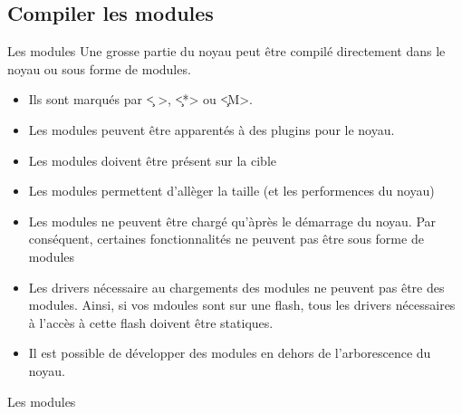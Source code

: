 \subsection{Compiler les modules}
\begin{frame}[fragile=singleslide]{Les modules}
  Une grosse  partie du  noyau peut être  compilé directement  dans le
  noyau ou sous forme de modules.
  \begin{itemize} 
  \item Ils sont marqués par \c{< >}, \c{<*>} ou \c{<M>}. 
  \item  Les modules  peuvent être  apparentés à  des plugins  pour le
    noyau.
  \item Les modules doivent être présent sur la cible
  \item   Les  modules   permettent  d'allèger   la  taille   (et  les
    performences du noyau)
  \item Les  modules ne peuvent  être chargé qu'àprès le  démarrage du
    noyau.  Par conséquent, certaines  fonctionnalités ne  peuvent pas
    être sous forme de modules
  \item Les  drivers nécessaire au chargements des  modules ne peuvent
    pas être  des modules. Ainsi, si  vos mdoules sont  sur une flash,
    tous les drivers nécessaires à  l'accès à cette flash doivent être
    statiques.
  \item  Il  est possible  de  développer  des  modules en  dehors  de
    l'arborescence du noyau.
  \end{itemize}
\end{frame}

\begin{frame}[fragile=singleslide]{Les modules}
\end{frame} 

